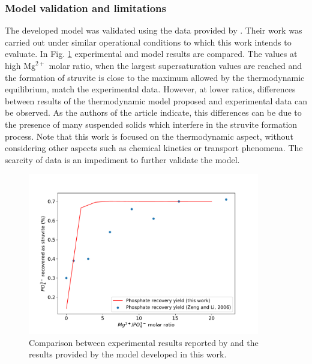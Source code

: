 \begin{refsection}[referencesCh3]
\subsubsection{Model validation and limitations}
The developed model was validated using the data provided by \citet{Zeng}. Their work was carried out under similar operational conditions to which this work intends to evaluate. In Fig. \ref{fig:validation} experimental and model results are compared. The values at high $\text{Mg}^{2+}$ molar ratio, when the largest supersaturation values are reached and the formation of struvite is close to the maximum allowed by the thermodynamic equilibrium, match the experimental data. However, at lower ratios, differences between results of the thermodynamic model proposed and experimental data can be observed. As the authors of the article indicate, this differences can be due to the presence of many suspended solids which interfere in the struvite formation process. Note that this work is focused on the thermodynamic aspect, without considering other aspects such as chemical kinetics or transport phenomena. The scarcity of data is an impediment to further validate the model.
\begin{figure}[h] 
	\centering
	\includegraphics[width=0.9\textwidth, trim=0 0.5cm 0 1.5cm, clip]{gfx/Chapter3/validation.pdf} 
	\caption{Comparison between experimental results reported by \protect\citet{Zeng} and the results provided by the model developed in this work.} \label{fig:validation}
\end{figure}


\end{refsection}
